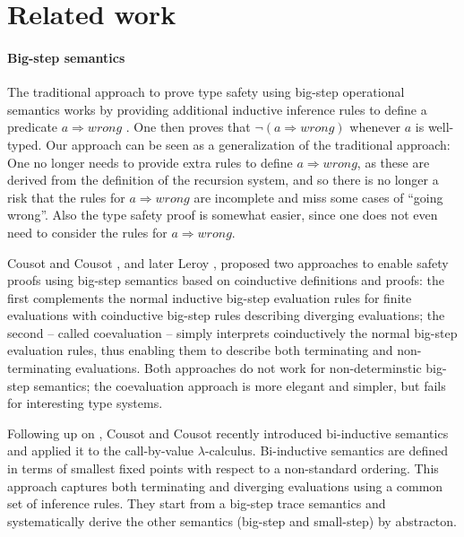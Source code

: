 \documentclass[a4paper,final,preprint,sort&compress]{elsarticle}
\begin{document}


\section{Related work}
\label{sec:Related_work}


\paragraph{Big-step semantics}

The traditional approach to prove type safety using big-step operational semantics works by
providing additional inductive inference rules to define a predicate $a \Rightarrow \mathit{wrong}$
\cite{Tofte87}. One then proves that \mbox{$\neg(a \Rightarrow \mathit{wrong})$} whenever $a$ is
well-typed. Our approach can be seen as a generalization of the traditional approach: One no longer
needs to provide extra rules to define \mbox{$a \Rightarrow \mathit{wrong}$}, as these are derived from
the definition of the recursion system, and so there is no longer a risk that the rules for
\mbox{$a \Rightarrow \mathit{wrong}$} are incomplete and miss some cases of ``going wrong''. Also
the type safety proof is somewhat easier, since one does not even need to consider the
rules for \mbox{$a \Rightarrow \mathit{wrong}$}.

Cousot and Cousot \cite{CousotCousot92}, and later Leroy \ETAL \cite{LeroyGrall09},
proposed two approaches to enable safety proofs using big-step semantics based on
coinductive definitions and proofs: the first complements the normal inductive big-step
evaluation rules for finite evaluations with coinductive big-step rules describing diverging
evaluations; the second -- called coevaluation -- simply interprets coinductively the normal
big-step evaluation rules, thus enabling them to describe both terminating and non-terminating
evaluations.
Both approaches do not work for non-determinstic big-step semantics; the
coevaluation approach is more elegant and simpler, but fails for interesting type systems.

Following up on \cite{CousotCousot92}, Cousot and Cousot recently introduced bi-inductive
semantics \cite{CousotCousot07} and applied it to the call-by-value $\lambda$-calculus.
Bi-inductive semantics are defined in terms of smallest fixed points with respect to a
non-standard ordering. This approach captures both terminating and diverging evaluations
using a common set of inference rules. They start from a big-step trace semantics and
systematically derive the other semantics (big-step and small-step) by abstracton.
\end{document}

